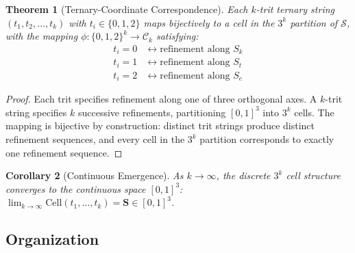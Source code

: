 \documentclass[12pt,a4paper]{article}
\theoremstyle{plain}
\newtheorem{theorem}{Theorem}[section]
\newtheorem{corollary}[theorem]{Corollary}
\theoremstyle{definition}
\theoremstyle{remark}
\newcommand{\Sspace}{\mathcal{S}}
\newcommand{\Sk}{S_k}
\newcommand{\St}{S_t}
\newcommand{\Se}{S_e}
\newcommand{\Scoord}{\mathbf{S}}
\begin{document}
\begin{theorem}[Ternary-Coordinate Correspondence]
\label{thm:ternary}
Each $k$-trit ternary string $(t_1,t_2,\ldots,t_k)$ with $t_i \in \{0,1,2\}$ maps bijectively to a cell in the $3^k$ partition of $\Sspace$, with the mapping $\phi: \{0,1,2\}^k \to \mathcal{C}_k$ satisfying:
\begin{align}
t_i = 0 &\leftrightarrow \text{refinement along } \Sk \\
t_i = 1 &\leftrightarrow \text{refinement along } \St \\
t_i = 2 &\leftrightarrow \text{refinement along } \Se
\end{align}
\end{theorem}

\begin{proof}
Each trit specifies refinement along one of three orthogonal axes. A $k$-trit string specifies $k$ successive refinements, partitioning $[0,1]^3$ into $3^k$ cells. The mapping is bijective by construction: distinct trit strings produce distinct refinement sequences, and every cell in the $3^k$ partition corresponds to exactly one refinement sequence.
\end{proof}

\begin{corollary}[Continuous Emergence]
As $k \to \infty$, the discrete $3^k$ cell structure converges to the continuous space $[0,1]^3$: $\lim_{k \to \infty} \text{Cell}(t_1,\ldots,t_k) = \Scoord \in [0,1]^3$.
\end{corollary}

\subsection{Organization}
\end{document}
